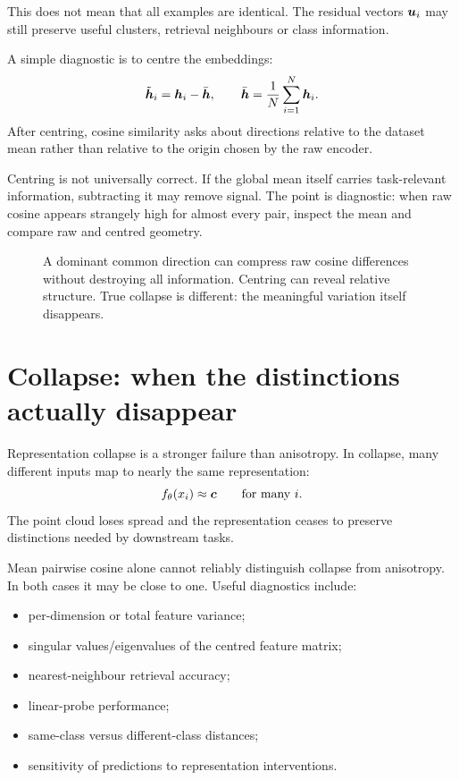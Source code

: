 This does not mean that all examples are identical. The residual vectors \(\bm{u}_i\) may still preserve useful clusters, retrieval neighbours or class information.

A simple diagnostic is to centre the embeddings:
\begin{equation}
  \tilde{\bm{h}}_i = \bm{h}_i - \bar{\bm{h}},
  \qquad
  \bar{\bm{h}} = \frac{1}{N}\sum_{i=1}^{N}\bm{h}_i.
  \label{eq:week10-centering}
\end{equation}
After centring, cosine similarity asks about directions relative to the dataset mean rather than relative to the origin chosen by the raw encoder.

Centring is not universally correct. If the global mean itself carries task-relevant information, subtracting it may remove signal. The point is diagnostic: when raw cosine appears strangely high for almost every pair, inspect the mean and compare raw and centred geometry.

\begin{figure}[ht]
  \caption{A dominant common direction can compress raw cosine differences without destroying all information. Centring can reveal relative structure. True collapse is different: the meaningful variation itself disappears.}
  \label{fig:week10-anisotropy-collapse}
\end{figure}

\section{Collapse: when the distinctions actually disappear}

Representation collapse is a stronger failure than anisotropy. In collapse, many different inputs map to nearly the same representation:
\[
  f_\theta(x_i) \approx \bm{c}
  \qquad\text{for many }i.
\]
The point cloud loses spread and the representation ceases to preserve distinctions needed by downstream tasks.

Mean pairwise cosine alone cannot reliably distinguish collapse from anisotropy. In both cases it may be close to one. Useful diagnostics include:
\begin{itemize}[leftmargin=*]
  \item per-dimension or total feature variance;
  \item singular values/eigenvalues of the centred feature matrix;
  \item nearest-neighbour retrieval accuracy;
  \item linear-probe performance;
  \item same-class versus different-class distances;
  \item sensitivity of predictions to representation interventions.
\end{itemize}

